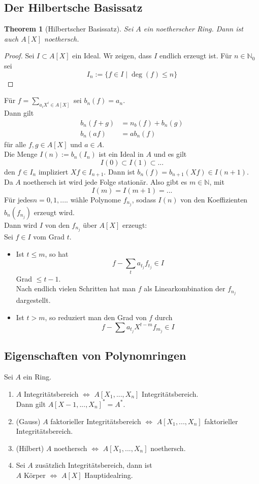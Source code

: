 \documentclass[10pt,a4paper]{article}
\newcommand{\N}{\ensuremath{\mathbb{N}}}
\theoremstyle{plain}
\newtheorem{theorem}{Theorem}[section]
\theoremstyle{definition}
\theoremstyle{remark}
\begin{document}
	\subsection{Der Hilbertsche Basissatz}
	\begin{theorem}[Hilbertscher Basissatz]
		Sei $A$ ein noetherscher Ring. Dann ist auch $A[X]$ noethersch.
	\end{theorem}
	\begin{proof}
		Sei $I\subset A[X]$ ein Ideal. Wr zeigen, dass $I$ endlich erzeugt ist. Für $n\in\N_0$ sei
		\[I_n:=\{f\in I\mid\deg(f)\leq n\}\]
	\end{proof}
	Für $f=\sum_{a_iX^i\in A[X]}$ sei $b_n(f)=a_n$.\\
	Dann gilt
	\begin{align*}
	b_n(f+g)&=n_b(f)+b_n(g)\\
	b_n(af)&=ab_n(f)
	\end{align*}
	für alle $f,g\in A[X]$ und $a\in A$.\\
	Die Menge $I(n):=b_n(I_n)$ ist ein Ideal in $A$ und es gilt
	\[I(0)\subset I(1)\subset...\]
	den $f\in I_n$ impliziert $Xf\in I_{n+1}$. Dann ist $b_n(f)=b_{n+1}(Xf)\in I(n+1)$.\\
	Da $A$ noethersch ist wird jede Folge stationär. Also gibt es $m\in\N$, mit 
	\[I(m)=I(m+1)=...\]
	Für jedes$ n=0,1,....$ wähle Polynome $f_{n_j}$, sodass $I(n)$ von den Koeffizienten $b_n(f_{n_j})$ erzeugt wird.\\
	Dann wird $I$ von den $f_{n_j}$ über $A[X]$ erzeugt:\\
	Sei $f\in I$ vom Grad $t$. 
	\begin{itemize}
		\item Ist $t\leq m$, so hat
		\[f-\sum_t a_{t_j} f_{t_j}\in I\]
		Grad $\leq t-1$.\\
		Nach endlich vielen Schritten hat man $f$ als Linearkombination der $f_{n_j}$ dargestellt. 
		\item Ist $t>m$, so reduziert man den Grad von $f$ durch
		\[f-\sum a_{t_j}X^{t-m}f_{m_j}\in I\]
	\end{itemize}

	\subsection{Eigenschaften von Polynomringen}
	Sei $A$ ein Ring.
	\begin{enumerate}
		\item $A$ Integritätsbereich $\Leftrightarrow$ $A[X_1,...,X_n]$ Integritätsbereich.\\
		Dann gilt $A[X-1,...,X_n]^*=A^*$.
		\item (Gauss) $A$ faktorieller Integritätsbereich $\Leftrightarrow$ $A[X_1,...,X_n]$ faktorieller Integritätsbereich.
		\item (Hilbert) $A$ noethersch $\Leftrightarrow$ $A[X_1,...,X_n]$ noethersch.
		\item Sei $A$ zusätzlich Integritätsbereich, dann ist\\
		$A$ Körper $\Leftrightarrow$ $A[X]$ Hauptidealring.
	\end{enumerate}
\end{document}

